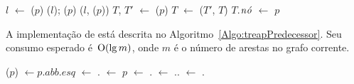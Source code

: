 \begin{algorithm}[h!]
\caption{\LCOCycle($p$)}
\label{Algo:LCOCycle}
\begin{algorithmic}[1]
\State $l$ $\gets$ \treapLast($p$)
\State\Return
\EndIf
\State \linkcutEvert($l$); \linkcutDelEdge($p$)
\State \linkcutAddEdge($l$, \treapFirst($p$))
\State $T$, $T'$ $\gets$ \treapSplitRight($p$)
\State $T$ $\gets$ \treapJoin($T'$, $T$)
\State $T$.$\mathit{n\acute{o}}$ $\gets$ $p$
\end{algorithmic}
\end{algorithm}

A implementação de \treapPredecessor{} está descrita no Algoritmo~\ref{Algo:treapPredecessor}.
Seu consumo esperado é~$\mathrm{O}(\lg m)$, onde $m$ é o número de arestas no grafo corrente.

\begin{algorithm}[h!]
\caption{\treapPredecessor($p$)}
\label{Algo:treapPredecessor}
\begin{algorithmic}[1]
\State\Return \treapLast($p$)
\EndIf
{}
\State {} $\gets p.abb.esq$
 $\gets$ .
\EndWhile
\State \Return {}
\EndIf
\State {} $\gets$ $p$
  $\gets$ .
\EndWhile
\State {}  $\gets$ ..
 $\gets$ .
\EndWhile
\State \Return {}

\end{algorithmic}
\end{algorithm}

